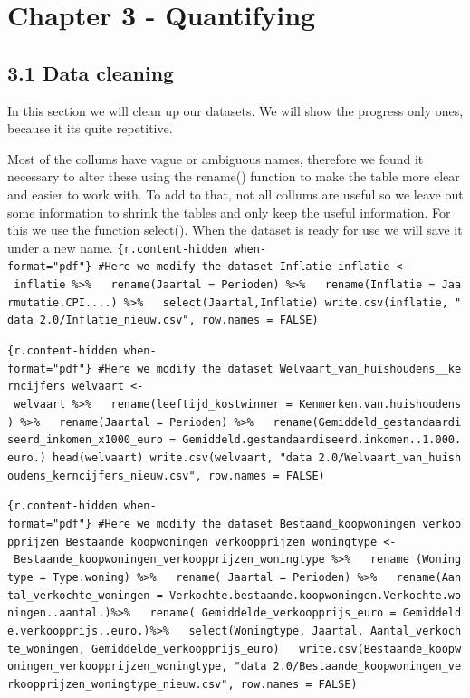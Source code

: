 \documentclass[
]{article}
\begin{document}
\section{Chapter 3 - Quantifying}\label{chapter-3---quantifying}

\subsection{3.1 Data cleaning}\label{data-cleaning}

In this section we will clean up our datasets. We will show the progress
only ones, because it its quite repetitive.

Most of the collums have vague or ambiguous names, therefore we found it
necessary to alter these using the rename() function to make the table
more clear and easier to work with. To add to that, not all collums are
useful so we leave out some information to shrink the tables and only
keep the useful information. For this we use the function select(). When
the dataset is ready for use we will save it under a new name.
\texttt{\{r.content-hidden\ when-format="pdf"\}\ \#Here\ we\ modify\ the\ dataset\ Inflatie\ inflatie\ \textless{}-\ inflatie\ \%\textgreater{}\%\ \ \ rename(Jaartal\ =\ Perioden)\ \%\textgreater{}\%\ \ \ rename(Inflatie\ =\ Jaarmutatie.CPI....)\ \%\textgreater{}\%\ \ \ select(Jaartal,Inflatie)\ write.csv(inflatie,\ "data\ 2.0/Inflatie\_nieuw.csv",\ row.names\ =\ FALSE)}

\texttt{\{r.content-hidden\ when-format="pdf"\}\ \#Here\ we\ modify\ the\ dataset\ Welvaart\_van\_huishoudens\_\_kerncijfers\ welvaart\ \textless{}-\ welvaart\ \%\textgreater{}\%\ \ \ rename(leeftijd\_kostwinner\ =\ Kenmerken.van.huishoudens)\ \%\textgreater{}\%\ \ \ rename(Jaartal\ =\ Perioden)\ \%\textgreater{}\%\ \ \ rename(Gemiddeld\_gestandaardiseerd\_inkomen\_x1000\_euro\ =\ Gemiddeld.gestandaardiseerd.inkomen..1.000.euro.)\ head(welvaart)\ write.csv(welvaart,\ "data\ 2.0/Welvaart\_van\_huishoudens\_kerncijfers\_nieuw.csv",\ row.names\ =\ FALSE)}

\texttt{\{r.content-hidden\ when-format="pdf"\}\ \#Here\ we\ modify\ the\ dataset\ Bestaand\_koopwoningen\ verkoopprijzen\ Bestaande\_koopwoningen\_verkoopprijzen\_woningtype\ \textless{}-\ Bestaande\_koopwoningen\_verkoopprijzen\_woningtype\ \%\textgreater{}\%\ \ \ rename\ (Woningtype\ =\ Type.woning)\ \%\textgreater{}\%\ \ \ rename(\ Jaartal\ =\ Perioden)\ \%\textgreater{}\%\ \ \ rename(Aantal\_verkochte\_woningen\ =\ Verkochte.bestaande.koopwoningen.Verkochte.woningen..aantal.)\%\textgreater{}\%\ \ \ rename(\ Gemiddelde\_verkoopprijs\_euro\ =\ Gemiddelde.verkoopprijs..euro.)\%\textgreater{}\%\ \ \ select(Woningtype,\ Jaartal,\ Aantal\_verkochte\_woningen,\ Gemiddelde\_verkoopprijs\_euro)\ \ \ write.csv(Bestaande\_koopwoningen\_verkoopprijzen\_woningtype,\ "data\ 2.0/Bestaande\_koopwoningen\_verkoopprijzen\_woningtype\_nieuw.csv",\ row.names\ =\ FALSE)}
\end{document}
